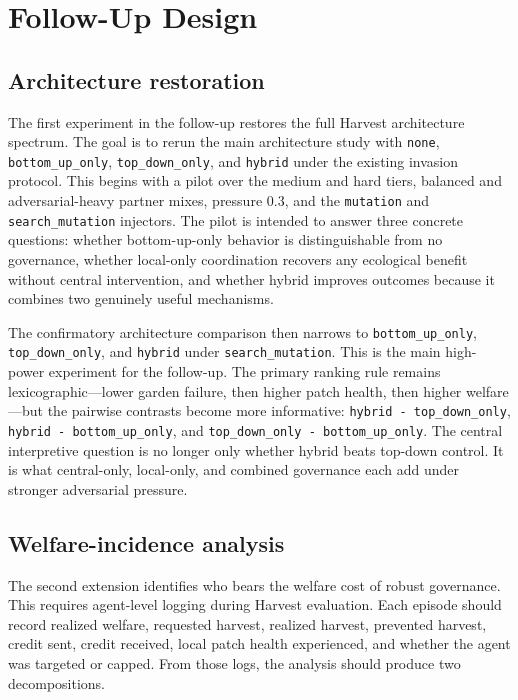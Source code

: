 \section{Follow-Up Design}

\subsection{Architecture restoration}

The first experiment in the follow-up restores the full Harvest architecture spectrum. The goal is to rerun the main architecture study with \texttt{none}, \texttt{bottom\_up\_only}, \texttt{top\_down\_only}, and \texttt{hybrid} under the existing invasion protocol. This begins with a pilot over the medium and hard tiers, balanced and adversarial-heavy partner mixes, pressure \(0.3\), and the \texttt{mutation} and \texttt{search\_mutation} injectors. The pilot is intended to answer three concrete questions: whether bottom-up-only behavior is distinguishable from no governance, whether local-only coordination recovers any ecological benefit without central intervention, and whether hybrid improves outcomes because it combines two genuinely useful mechanisms.

The confirmatory architecture comparison then narrows to \texttt{bottom\_up\_only}, \texttt{top\_down\_only}, and \texttt{hybrid} under \texttt{search\_mutation}. This is the main high-power experiment for the follow-up. The primary ranking rule remains lexicographic---lower garden failure, then higher patch health, then higher welfare---but the pairwise contrasts become more informative: \texttt{hybrid - top\_down\_only}, \texttt{hybrid - bottom\_up\_only}, and \texttt{top\_down\_only - bottom\_up\_only}. The central interpretive question is no longer only whether hybrid beats top-down control. It is what central-only, local-only, and combined governance each add under stronger adversarial pressure.

\subsection{Welfare-incidence analysis}

The second extension identifies who bears the welfare cost of robust governance. This requires agent-level logging during Harvest evaluation. Each episode should record realized welfare, requested harvest, realized harvest, prevented harvest, credit sent, credit received, local patch health experienced, and whether the agent was targeted or capped. From those logs, the analysis should produce two decompositions.

